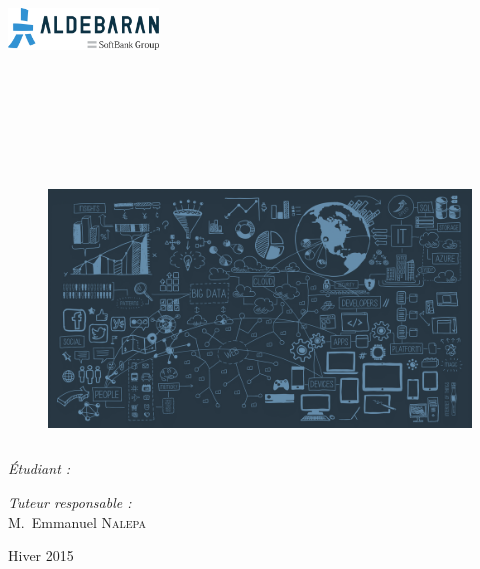 \begin{center}

\begin{minipage}[t]{1.1\textwidth}
  \begin{flushright}
    \includegraphics [width=40mm,height=12mm]{images/aldebaran_logo.png} \\[0.5cm]
  \end{flushright}
\end{minipage} \\[2cm]

\textsc{\Large \reportsubject}\\[1cm]
\HRule \\[0.25cm]
\textsc{\Large \reporttitle}
{
\HRule \\[2cm]
\begin{figure}[h]
	\centering\includegraphics[width=14cm,height=7cm]{images/main_picture.png}
\end{figure}
\bigbreak\bigbreak\bigbreak\bigbreak
\begin{minipage}[t]{0.3\textwidth}
  \begin{flushleft} \large
    \emph{\Large{Étudiant :}}\\ 
    \reportauthor
  \end{flushleft}
\end{minipage}
\begin{minipage}[ht]{0.6\textwidth}
  \begin{flushright} \large
    \emph{\Large{Tuteur responsable :}} \\
    \Large{M.~Emmanuel \textsc{Nalepa}}
  \end{flushright}
\end{minipage}
}
\vfill

{\large Hiver 2015}

\thispagestyle{empty} %

\end{center}

